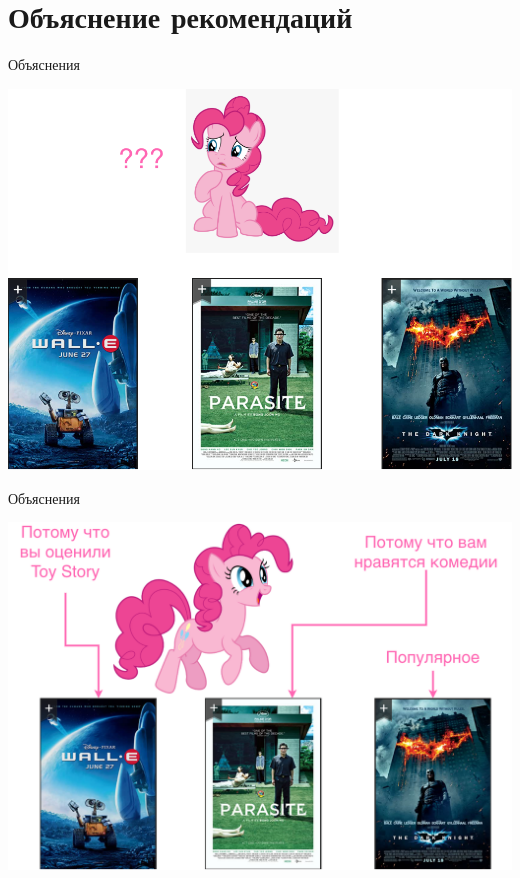 \documentclass[11pt,aspectratio=169,handout]{beamer}
\begin{document}
\section{Объяснение рекомендаций}

\begin{frame}{Объяснения}

\begin{center}
\includegraphics[scale=0.22]{images/explainability-1.png}
\end{center}

\end{frame}

\begin{frame}{Объяснения}

\begin{center}
\includegraphics[scale=0.22]{images/explainability-2.png}
\end{center}

\end{frame}
\end{document}
